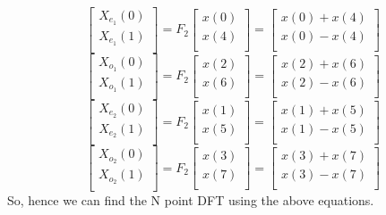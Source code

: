 \documentclass[journal,12pt,twocolumn]{IEEEtran}
\renewcommand\thesection{\arabic{section}}
\begin{document}
\begin{enumerate}[label=\thesection.\arabic*.,ref=\thesection.\theenumi]
\begin{equation}
\begin{bmatrix}
X_{e_{1}}(0) \\ 
X_{e_{1}}(1)\\ 
\end{bmatrix}
= F_{2}
\begin{bmatrix}
x(0) \\ 
x(4) \\ 
\end{bmatrix}
=
\begin{bmatrix}
x(0)+x(4) \\ 
x(0)-x(4) \\ 
\end{bmatrix}
\end{equation}
\begin{equation}
\begin{bmatrix}
X_{o_{1}}(0) \\ 
X_{o_{1}}(1)\\ 
\end{bmatrix}
= F_{2}
\begin{bmatrix}
x(2) \\ 
x(6) \\ 
\end{bmatrix}
=
\begin{bmatrix}
x(2)+x(6) \\ 
x(2)-x(6) \\ 
\end{bmatrix}
\end{equation}
\begin{equation}
\begin{bmatrix}
X_{e_{2}}(0) \\ 
X_{e_{2}}(1)\\ 
\end{bmatrix}
= F_{2}
\begin{bmatrix}
x(1) \\ 
x(5) \\ 
\end{bmatrix}
=
\begin{bmatrix}
x(1)+x(5) \\ 
x(1)-x(5) \\ 
\end{bmatrix}
\end{equation}
\begin{equation}
\begin{bmatrix}
X_{o_{2}}(0) \\ 
X_{o_{2}}(1)\\ 
\end{bmatrix}
= F_{2}
\begin{bmatrix}
x(3) \\ 
x(7) \\ 
\end{bmatrix}
=
\begin{bmatrix}
x(3)+x(7) \\ 
x(3)-x(7) \\ 
\end{bmatrix}
\end{equation}
So, hence we can find the N point DFT using the above equations.


\end{enumerate}
\end{document}
